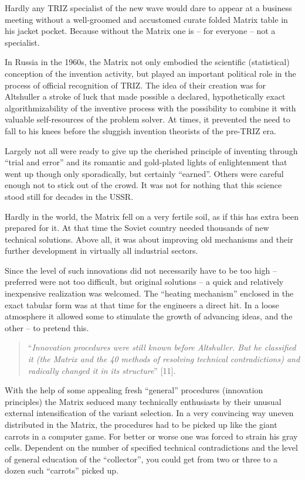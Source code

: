 \documentclass[11pt,a4paper]{article}
\begin{document}
Hardly any TRIZ specialist of the new wave would dare to appear at a business
meeting without a well-groomed and accustomed curate folded Matrix table in
his jacket pocket. Because without the Matrix one is -- for everyone -- not a
specialist.

In Russia in the 1960s, the Matrix not only embodied the scientific
(statistical) conception of the invention activity, but played an important
political role in the process of official recognition of TRIZ. The idea of
their creation was for Altshuller a stroke of luck that made possible a
declared, hypothetically exact algorithmizability of the inventive process
with the possibility to combine it with valuable self-resources of the problem
solver. At times, it prevented the need to fall to his knees before the
sluggish invention theorists of the pre-TRIZ era.

Largely not all were ready to give up the cherished principle of inventing
through ``trial and error'' and its romantic and gold-plated lights of
enlightenment that went up though only sporadically, but certainly ``earned''.
Others were careful enough not to stick out of the crowd. It was not for
nothing that this science stood still for decades in the USSR.

Hardly in the world, the Matrix fell on a very fertile soil, as if this has
extra been prepared for it. At that time the Soviet country needed thousands
of new technical solutions. Above all, it was about improving old mechanisms
and their further development in virtually all industrial sectors.

Since the level of such innovations did not necessarily have to be too high --
preferred were not too difficult, but original solutions -- a quick and
relatively inexpensive realization was welcomed. The ``heating mechanism''
enclosed in the exact tabular form was at that time for the engineers a direct
hit. In a loose atmosphere it allowed some to stimulate the growth of advancing
ideas, and the other -- to pretend this.  
\begin{quote}
  ``\emph{Innovation procedures were still known before Altshuller. But he
    classified it (the Matrix and the 40 methods of resolving technical
    contradictions) and radically changed it in its structure}'' [11].
\end{quote}
With the help of some appealing fresh ``general'' procedures (innovation
principles) the Matrix seduced many technically enthusiasts by their unusual
external intensification of the variant selection. In a very convincing way
uneven distributed in the Matrix, the procedures had to be picked up like the
giant carrots in a computer game. For better or worse one was forced to strain
his gray cells. Dependent on the number of specified technical contradictions
and the level of general education of the ``collector'', you could get from
two or three to a dozen such ``carrots'' picked up.
\end{document}

